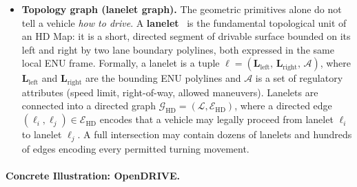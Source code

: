\documentclass{book}
\begin{document}
\begin{itemize}
\begin{itemize}
        \item \emph{Road surface}: A triangulated mesh
        $\mathcal{T} = (\mathcal{V}, \mathcal{F})$ where:
        \begin{itemize}
            \item $\mathcal{V} = \{ \mathbf{v}_j = (e_j, n_j, u_j) \}$
            is the set of ENU vertices encoding elevation $u$ with
            centimeter-level precision above the ellipsoid.
            \item $\mathcal{F} = \{ (j, k, l) \}$ is the set of
            triangular faces satisfying the Delaunay condition in the
            $(e, n)$ horizontal plane.
            \item Material properties are encoded via a semantic
            mapping $\mu: \mathcal{F} \to
            \{\text{asphalt, concrete, gravel}\}$.
            \item Potholes are identified as subsets of faces
            $\mathcal{F}_{pothole} \subset \mathcal{F}$ with high
            local variance in the surface normal $\mathbf{\hat{n}}_f$.
        \end{itemize}
    \end{itemize}

  \item \textbf{Topology graph (lanelet graph).}  The geometric
    primitives alone do not tell a vehicle \emph{how to drive}.  A
    \textbf{lanelet}~\cite{bender2014lanelets} is the fundamental
    topological unit of an HD Map: it is a short, directed segment of
    drivable surface bounded on its left and right by two lane boundary
    polylines, both expressed in the same local ENU frame.  Formally,
    a lanelet is a tuple $\ell = (\mathbf{L}_{\text{left}},\,
    \mathbf{L}_{\text{right}},\, \mathcal{A})$, where
    $\mathbf{L}_{\text{left}}$ and $\mathbf{L}_{\text{right}}$ are
    the bounding ENU polylines and $\mathcal{A}$ is a set of
    regulatory attributes (speed limit, right-of-way, allowed
    maneuvers).  Lanelets are connected into a directed graph
    $\mathcal{G}_{\text{HD}} = (\mathcal{L},
    \mathcal{E}_{\text{HD}})$, where a directed edge
    $({\ell}_i, {\ell}_j) \in \mathcal{E}_{\text{HD}}$ encodes that a
    vehicle may legally proceed from lanelet $\ell_i$ to lanelet
    $\ell_j$.  A full intersection may contain dozens of lanelets and
    hundreds of edges encoding every permitted turning movement.
\end{itemize}

\paragraph{Concrete Illustration: OpenDRIVE.}
\end{document}
